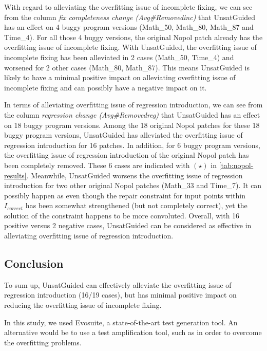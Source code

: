 With regard to alleviating the overfitting issue of incomplete fixing, we can see from the column \emph{fix completeness change (Avg\#Removedinc)} that UnsatGuided has an effect on 4 buggy program versions (Math\_50, Math\_80, Math\_87 and Time\_4). 
For all those 4 buggy versions, the original Nopol patch already has the overfitting issue of incomplete fixing. 
With UnsatGuided, the overfitting issue of incomplete fixing has been alleviated in 2 cases (Math\_50, Time\_4) and worsened for 2 other cases (Math\_80, Math\_87). 
This means UnsatGuided is likely to have a minimal positive impact on alleviating overfitting issue of incomplete fixing and can possibly have a negative impact on it.

In terms of alleviating overfitting issue of regression introduction, we can see from the column \emph{regression change (Avg\#Removedreg)} that UnsatGuided has an effect on 18 buggy program versions. 
Among the 18 original Nopol patches for these 18 buggy program versions, UnsatGuided has alleviated the overfitting issue of regression introduction for 16 patches. 
In addition, for 6 buggy program versions, the overfitting issue of regression introduction of the original Nopol patch has been completely removed.  
These 6 cases are indicated with $(\star)$ in \autoref{tab:nopol-results}. 
Meanwhile, UnsatGuided worsens the overfitting issue of regression introduction for two other original Nopol patches (Math\_33 and Time\_7). 
It can possibly happen as even though the repair constraint for input points within $I_{correct}$ has been somewhat strengthened (but not completely correct), yet the solution of the constraint happens to be more convoluted.
Overall, with 16 positive versus 2 negative cases, UnsatGuided can be considered as effective in alleviating overfitting issue of regression introduction. 

\subsection{Conclusion}
\label{subsec:transversal-contributions:test-for-repair:conclusion}

To sum up, UnsatGuided can effectively alleviate the overfitting issue of regression introduction (16/19 cases), but has minimal positive impact on reducing the overfitting issue of incomplete fixing.

In this study, we used Evosuite, a state-of-the-art test generation tool.
An alternative would be to use a test amplification tool, such as \dspot in order to overcome the overfitting problems.

